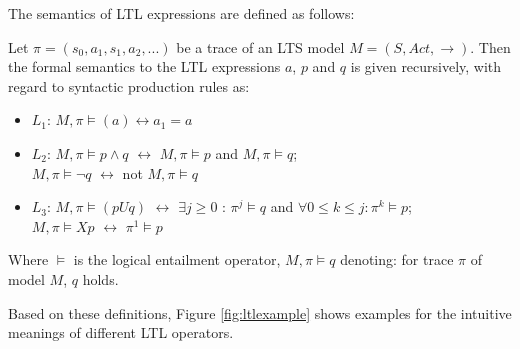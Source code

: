 The semantics of LTL expressions are defined as follows:
\begin{definition}
	\label{def:ltlsemantics}
	Let $\pi = (s_0, a_1, s_1, a_2, ... )$ be a trace of an LTS model $M=(S, Act, \rightarrow)$. Then the formal semantics to the LTL expressions $a$, $p$ and $q$ is given recursively, with regard to syntactic production rules as:
	\begin{itemize}
		\item $L_1$: $M,\pi \vDash (a) \leftrightarrow a_1 = a$ 
		\item $L_2$: $M,\pi \vDash p \land q$ $\leftrightarrow$  $M,\pi \vDash p$ and  $M,\pi \vDash q$; \\
		$M,\pi \vDash \neg q$ $\leftrightarrow$ not  $M,\pi \vDash q$
		\item $L_3$: $M,\pi \vDash (p U q)$ $\leftrightarrow$  $\exists j \geq 0$ : $\pi^j \vDash q$ and $\forall 0 \leq k \leq j : \pi^k \vDash p$; \\
		$M,\pi \vDash X p$ $\leftrightarrow$ $\pi^1 \vDash p$
	\end{itemize}
	Where $\vDash$ is the logical entailment operator, $M,\pi \vDash q$ denoting: for trace $\pi$ of model $M$, $q$ holds.
	
\end{definition}

\begin{example}
	\label{ex:ltlexample}
	Based on these definitions, Figure \ref{fig:ltlexample} shows examples for the intuitive meanings of different LTL operators.
\end{example}

